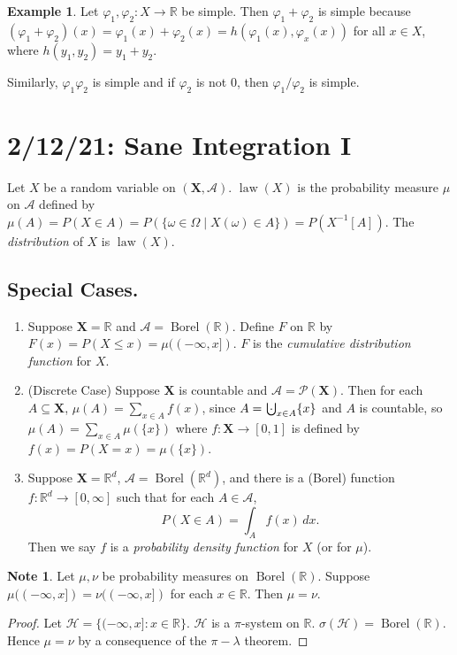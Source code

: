 \documentclass{article}
\DeclareMathOperator{\law}{law}
\DeclareMathOperator{\Borel}{Borel}
\newcommand{\R}{\mathbb{R}}
\newcommand{\oo}{{\infty}}
\newcommand{\bigcupdot}{\mathop{\mathchoice{\hspace{0.45em}}{\hspace{0.35em}}{}{}\cdot\mathchoice{\hspace{-0.85em}}{\hspace{-0.725em}}{}{}\bigcup\limits}}
\theoremstyle{definition}
\newtheorem*{example}{Example}
\newtheorem*{note}{Note}
\begin{document}
\begin{example}
Let $\varphi_1, \varphi_2: X \longrightarrow \R$ be simple. Then $\varphi_1 + \varphi_2$ is simple because $(\varphi_1 + \varphi_2)(x) = \varphi_1(x) + \varphi_2(x) = h(\varphi_1(x), \varphi_x(x))$ for all $x \in X$, where $h(y_1, y_2) = y_1 + y_2$.

Similarly, $\varphi_1 \varphi_2$ is simple and if $\varphi_2$ is not 0, then $\varphi_1/\varphi_2$ is simple.
\end{example}

\section*{2/12/21: Sane Integration I}
Let $X$ be a random variable on $(\mathbf{X}, \mathscr{A})$.
$\law(X)$ is the probability measure $\mu$ on $\mathscr{A}$ defined by $\mu(A) = P(X \in A) = P(\{\omega\in\Omega\mid X(\omega)\in A\}) = P(X^{-1}[A])$.
The \emph{distribution} of $X$ is $\law(X)$.
\subsection*{Special Cases.}
\begin{enumerate}
    \item Suppose $\mathbf{X} = \R$ and $\mathscr{A} = \Borel(\R)$.
    Define $F$ on $\R$ by $F(x) = P(X \leq x) = \mu((-\infty, x])$. $F$ is the \emph{cumulative distribution function} for $X$.
    \item (Discrete Case) Suppose $\mathbf{X}$ is countable and $\mathscr{A} = \mathcal{P}(\mathbf{X})$. Then for each $A \subseteq \mathbf{X}$, $\mu(A) = \sum_{x \in A} f(x)$, since $A = \bigcupdot_{x \in A} \{x\}$ and $A$ is countable, so $\mu(A) = \sum_{x \in A} \mu(\{x\})$
    where $f: \mathbf{X} \longrightarrow [0,1]$ is defined by $f(x)= P(X = x) = \mu(\{x\})$.
    \item Suppose $\mathbf{X} = \R^d$, $\mathscr{A} = \Borel(\R^d)$, and there is a (Borel) function $f: \R^d \longrightarrow [0,\infty]$ such that for each $A \in \mathscr{A}$,
    \[
        P(X \in A) = \int_A f(x)\,dx.
    \]
    Then we say $f$ is a \emph{probability density function} for $X$ (or for $\mu$).
\end{enumerate}
\begin{note}
Let $\mu, \nu$ be probability measures on $\Borel(\R)$. Suppose $\mu((-\oo, x]) = \nu((-\oo, x])$ for each $x \in \R$. Then $\mu = \nu$. 
\end{note}
\begin{proof}
    Let $\mathscr{H} = \{(-\infty, x] : x \in \R\}$. $\mathscr{H}$ is a $\pi$-system on $\R$. $\sigma(\mathscr{H}) = \Borel(\R)$. Hence $\mu = \nu$ by a consequence of the $\pi-\lambda$ theorem.
\end{proof}
\end{document}
